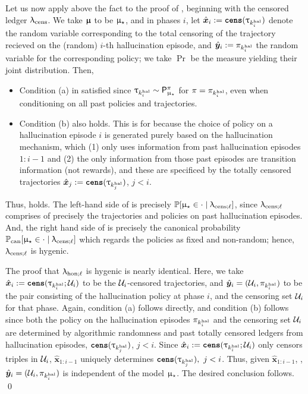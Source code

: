 Let us now apply above the fact to the proof of , beginning with the censored ledger $\ledcens$. We take $\modvar$  to be $\modst$, and in phases $i$, let $\hat{\bm{x}}_i := \cens(\traj_{\kexpl[i]})$ denote the random variable corresponding to the total censoring of the trajectory recieved on the (random) $i$-th hallucination episode, and $\hat{\bm{y}}_i := \pi_{\kexpl[i]}$ the random variable for the corresponding policy; we take $\Pr$ be the measure yielding their joint distribution. Then,
\begin{itemize}
	\item Condition (a) in   satisfied since $\traj_{\kexpl[i]} \sim \sfP^{\pi}_{\modelst}$ for $\pi = \pi_{\kexpl[i]}$, even when conditioning on all past policies and trajectories.
	\item Condition (b) also holds. This is for because the choice of policy on a hallucination episode $i$ is generated purely based on the hallucination mechanism, which (1) only uses information from past hallucination episodes $1:i-1$ and (2) the only information from those past episodes are transition information (not rewards), and these are specificed by the totally censored trajectories $\hat{\bm{x}}_j := \cens(\traj_{\kexpl[j]})$, $j < i$.
\end{itemize}
  Thus,  holds. The left-hand side of  is precisely $\Pr[\modst \in \cdot \mid \ledcensl]$, since $\ledcensl$ comprises of precisely the trajectories and policies on past hallucination episodes. And, the right hand side of  is precisely the canonical probability $\Prcan[\modst \in \cdot \mid \ledcensl]$ which regards the policies as fixed and non-random; hence, $\ledcensl$ is hygenic.

  The proof that $\ledhonl$ is hygenic is nearly identical. Here, we take $\hat{\bm{x}}_i := \cens(\traj_{\kexpl[i]};\calU_i)$ to be the $\calU_i$-censored trajectories, and $\hat{\bm{y}}_i = (\calU_i,\pi_{\kexpl[i]})$ to be the pair consisting of the hallucination policy at phase $i$, and the censoring set $\calU_i$ for that phase. Again, condition (a) follows directly, and condition (b) follows since both the policy on the hallucination episodes $\pi_{\kexpl[i]}$ and the censoring set $\calU_i$ are determined by algorithmic randomness and past totally censored ledgers from hallucination episodes, $\cens(\traj_{\kexpl[j]})$, $j < i$. Since $\hat{\bm{x}}_i := \cens(\traj_{\kexpl[i]};\calU_i)$ only censors triples in $\calU_i$, $\hat{\bm{x}}_{1:i-1}$ uniquely determines $\cens(\traj_{\kexpl[j]}), ~j < i$. Thus, given $\hat{\bm{x}}_{1:i-1}$, , $\hat{\bm{y}}_i = (\calU_i,\pi_{\kexpl[i]})$ is independent of the model $\modst$. The desired conclusion follows.
	\qed

